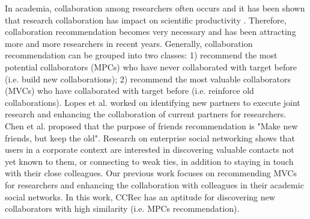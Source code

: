 \documentclass[10pt]{article}
\begin{document}
In academia, collaboration among researchers often occurs and it has been shown that research collaboration has impact on scientific productivity \cite{lee2005impact}. Therefore, collaboration recommendation becomes very necessary and has been attracting more and more researchers in recent years. Generally, collaboration recommendation can be grouped into two classes: 1) recommend the most potential collaborators (MPCs) who have never collaborated with target before (i.e. build new collaborations); 2) recommend the most valuable collaborators (MVCs) who have collaborated with target before (i.e. reinforce old collaborations). Lopes et al. \cite{lopes2010collaboration} worked on identifying new partners to execute joint research and enhancing the collaboration of current partners for researchers. Chen et al. \cite{chen2009make} proposed that the purpose of friends recommendation is "Make new friends, but keep the old". Research on enterprise social networking \cite{dimicco2008motivations} shows that users in a corporate context are interested in discovering valuable contacts not yet known to them, or connecting to weak ties, in addition to staying in touch with their close colleagues. Our previous work \cite{li2014acrec,xia2014mvcwalker} focuses on recommending MVCs for researchers and enhancing the collaboration with colleagues in their academic social networks. In this work, CCRec has an aptitude for discovering new collaborators with high similarity (i.e. MPCs recommendation).
\end{document}
